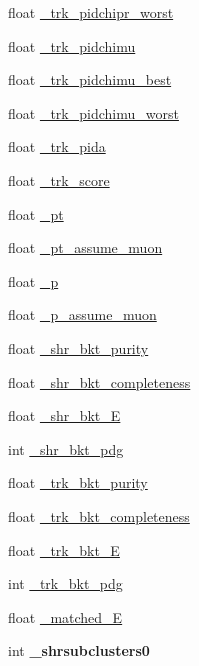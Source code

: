\begin{DoxyCompactItemize}
float \hyperlink{classselection_1_1CC0piNpSelection_a6c06ff43f89cbee19cf466b830a6fe38}{\+\_\+trk\+\_\+pidchipr\+\_\+worst}
\item 
float \hyperlink{classselection_1_1CC0piNpSelection_a74ddf5622f3ee32110e9342361020a89}{\+\_\+trk\+\_\+pidchimu}
\item 
float \hyperlink{classselection_1_1CC0piNpSelection_a04216d0564f79f3c4a267130cd70e753}{\+\_\+trk\+\_\+pidchimu\+\_\+best}
\item 
float \hyperlink{classselection_1_1CC0piNpSelection_a9e88e0ae759d19106d964c13926fba4b}{\+\_\+trk\+\_\+pidchimu\+\_\+worst}
\item 
float \hyperlink{classselection_1_1CC0piNpSelection_af0fe49227e33b3f46015a821de58ba1f}{\+\_\+trk\+\_\+pida}
\item 
float \hyperlink{classselection_1_1CC0piNpSelection_a72517a224dc19f95faef3efde9a999d1}{\+\_\+trk\+\_\+score}
\item 
float \hyperlink{classselection_1_1CC0piNpSelection_a98281b58b33ff8c03fa9b00f3f3baa06}{\+\_\+pt}
\item 
float \hyperlink{classselection_1_1CC0piNpSelection_a4213e006ba267c2ff55415cc9ef07bf8}{\+\_\+pt\+\_\+assume\+\_\+muon}
\item 
float \hyperlink{classselection_1_1CC0piNpSelection_afae64b232d6b3526032b289c91b092cb}{\+\_\+p}
\item 
float \hyperlink{classselection_1_1CC0piNpSelection_a2e861bf5b394c18e24f58d9fef5c33a5}{\+\_\+p\+\_\+assume\+\_\+muon}
\item 
float \hyperlink{classselection_1_1CC0piNpSelection_a1da68886d5b7a5b4eb1785649c48e8ef}{\+\_\+shr\+\_\+bkt\+\_\+purity}
\item 
float \hyperlink{classselection_1_1CC0piNpSelection_ac3c3c9895ca501c3b73f14addfddf495}{\+\_\+shr\+\_\+bkt\+\_\+completeness}
\item 
float \hyperlink{classselection_1_1CC0piNpSelection_aa1a21f48d99a4de5f1d444aa3d64dedf}{\+\_\+shr\+\_\+bkt\+\_\+E}
\item 
int \hyperlink{classselection_1_1CC0piNpSelection_aab09f93d7cd57031de714956414f3230}{\+\_\+shr\+\_\+bkt\+\_\+pdg}
\item 
float \hyperlink{classselection_1_1CC0piNpSelection_a39a84b873306f200a2350b4804429791}{\+\_\+trk\+\_\+bkt\+\_\+purity}
\item 
float \hyperlink{classselection_1_1CC0piNpSelection_aab22ce289e2d4a109440369e30fddf52}{\+\_\+trk\+\_\+bkt\+\_\+completeness}
\item 
float \hyperlink{classselection_1_1CC0piNpSelection_aa7a6076f1169185e0b2b02fbb03aba22}{\+\_\+trk\+\_\+bkt\+\_\+E}
\item 
int \hyperlink{classselection_1_1CC0piNpSelection_a7044de37ee4f3615ffe4bb15e9f00f8e}{\+\_\+trk\+\_\+bkt\+\_\+pdg}
\item 
float \hyperlink{classselection_1_1CC0piNpSelection_ac75aa3ac33061bbdd378594ee7e6e2e5}{\+\_\+matched\+\_\+E}
\item 
int {\bfseries \+\_\+shrsubclusters0}\hypertarget{classselection_1_1CC0piNpSelection_a670d3708a1060017b414acd416c02b5c}{}\label{classselection_1_1CC0piNpSelection_a670d3708a1060017b414acd416c02b5c}


\end{DoxyCompactItemize}
